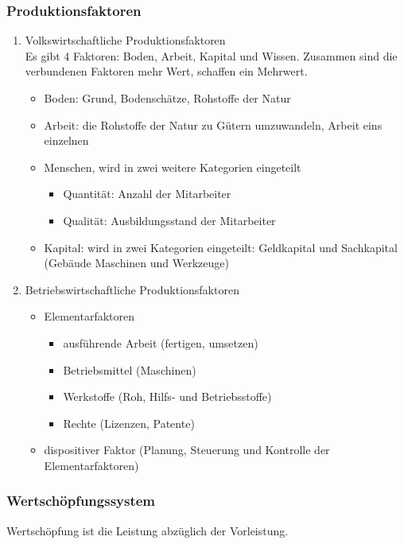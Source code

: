 \documentclass[]{article}
\begin{document}
\subsubsection{Produktionsfaktoren}

\begin{enumerate}
	\item Volkswirtschaftliche Produktionsfaktoren\\
	Es gibt 4 Faktoren: Boden, Arbeit, Kapital und Wissen. Zusammen sind die verbundenen Faktoren mehr Wert, schaffen ein Mehrwert. \\
	\begin{itemize}
		\item Boden: Grund, Bodenschätze, Rohstoffe der Natur
		\item Arbeit: die Rohstoffe der Natur zu Gütern umzuwandeln, Arbeit eins einzelnen
		\item Menschen, wird in zwei weitere Kategorien eingeteilt
		\begin{itemize}
			\item Quantität: Anzahl der Mitarbeiter
			\item Qualität: Ausbildungsstand der Mitarbeiter
		\end{itemize}
		\item 	Kapital: wird in zwei Kategorien eingeteilt: Geldkapital und Sachkapital (Gebäude Maschinen und Werkzeuge)
	\end{itemize}
	
	\item Betriebswirtschaftliche Produktionsfaktoren
	\begin{itemize}
		\item Elementarfaktoren
		\begin{itemize}
			\item ausführende Arbeit (fertigen, umsetzen)
			\item Betriebsmittel (Maschinen)
			\item Werkstoffe (Roh, Hilfs- und Betriebsstoffe)
			\item Rechte (Lizenzen, Patente)
		\end{itemize}
		\item dispositiver Faktor (Planung, Steuerung und Kontrolle der Elementarfaktoren)
	\end{itemize}
\end{enumerate}

\subsubsection{Wertschöpfungssystem}
Wertschöpfung ist die Leistung abzüglich der Vorleistung. \\
\end{document}
